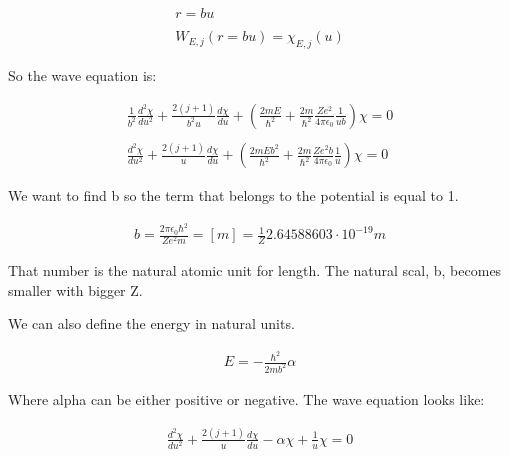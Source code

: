 \begin{equation}
  \begin{array}{c}
    r = b u
    \\

    \\
    W_{E,j}(r=bu) = \chi_{E,j}(u)
  \end{array}
\end{equation}

So the wave equation is:

\begin{equation}
  \begin{array}{c}
  \frac{1}{b^2} \frac{d^2\chi}{du^2} + \frac{2(j+1)}{b^2 u}\frac{d \chi}{du} + \left(\frac{2mE}{\hbar^2} + \frac{2m}{\hbar^2}\frac{Ze^2}{4\pi\epsilon_0}\frac{1}{ub}\right)\chi = 0
  \\

  \\
  \frac{d^2\chi}{du^2} + \frac{2(j+1)}{u} \frac{d\chi}{du} + \left(\frac{2mEb^2}{\hbar^2}+\frac{2m}{\hbar^2}\frac{Ze^2 b}{4\pi\epsilon_0}\frac{1}{u}\right)\chi = 0
  \end{array}
\end{equation}

We want to find b so the term that belongs to the potential is equal to 1.

\begin{equation}
  \begin{array}{c}
    b = \frac{2\pi \epsilon_0 \hbar^2}{Z e^2 m} = [m] = \frac{1}{Z} 2.64588603 \cdot 10^{-19} m
  \end{array}
\end{equation}

That number is the natural atomic unit for length. The natural scal, b, becomes smaller with bigger Z.

We can also define the energy in natural units.

\begin{equation}
  \begin{array}{c}
    E = -\frac{\hbar^2}{2mb^2}\alpha
  \end{array}
\end{equation}

Where alpha can be either positive or negative. The wave equation looks like:

\begin{equation}
  \begin{array}{c}
    \frac{d^2\chi}{du^2} + \frac{2(j+1)}{u}\frac{d\chi}{du}-\alpha\chi +\frac{1}{u}\chi= 0
  \end{array}
\end{equation}

